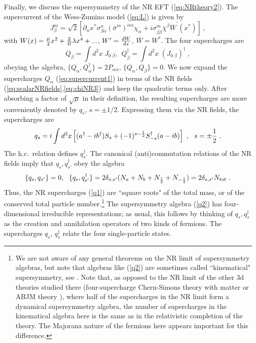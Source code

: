 \documentclass[11pt]{article}
\begin{document}
Finally, we discuss the supersymmetry of the NR EFT (\ref{eq:NRtheory2}). The supercurrent  of the Wess-Zumino model (\ref{eq:L}) is given by
  \cite{Shifman:1999mk}   \begin{equation}
    \label{eq:supercurrent1}
    J_\beta^m = \sqrt{2} \left[ \partial_n x^* \sigma^n_{\beta \dot\alpha} (\bar\sigma^m)^{\dot\alpha \alpha} \chi_\alpha + i \sigma^m_{\beta \dot\beta} \bar\chi^{\dot\beta} \overline{W}^\prime(x^*) \right]~,
    \end{equation}
 with $W(x) = {\mu \over 2} x^2 + {2 \over 4!} \lambda x^4 +...$, $W^\prime = {d W\over dx}$, $\overline{W}=W^*$. The four supercharges are 
\begin{equation}
\label{eq:supercharges1}
Q_\beta = \int d^2 x \; J_{0 \; \beta}, ~~ Q_{\dot\beta}^\dagger = \int d^2 x\; (J_{0 \; \beta})^\dagger~,
\end{equation}
obeying the algebra, $ \{ Q_\alpha, Q_{\dot\alpha}^\dagger  \} = 2 P_{\alpha \dot\alpha}$, $\{ Q_\alpha, Q_\beta \} = 0$. 
We now expand the supercharges $Q_\alpha$ (\ref{eq:supercurrent1}) in terms of the NR fields (\ref{eq:scalarNRfields},\ref{eq:chiNR3})  and keep the quadratic terms only. After absorbing a factor of $\sqrt{\mu}$ in their definition, the resulting supercharges  are more conveniently  denoted by $q_s$, $s = \pm 1/2$. Expressing them via the NR fields,  the supercharges  are
\begin{equation}\label{q1}
q_s = i \int d^2 x \left[ (a^\dagger - i b^\dagger) S_s + (-1)^{s-{1\over 2}} S_{-s}^\dagger (a  - i b)\right]~,~~ s = \pm{1 \over 2}~.
\end{equation}
The h.c.~relation defines $q_s^\dagger$.
The canonical (anti)commutation relations of the NR fields imply that  $q_s, q_{s'}^\dagger$ obey the algebra
\begin{align}
\label{q2}
\{ q_s, q_{s'}\} = 0, ~~ \{q_s, q_{s'}^\dagger\} = 2 \delta_{s,s'}(N_a + N_b + N_{1\over 2} + N_{-{1 \over 2}}) = 2 \delta_{s,s'} N_{tot}~.
\end{align}
Thus, the NR supercharges (\ref{q1}) are ``square roots" of the total mass, or of the conserved  total particle number.\footnote{We are not aware of any general theorems on the NR limit of supersymmetry algebras, but note that algebras  like (\ref{q2}) are sometimes called ``kinematical" supersymmetry,  see  \cite{Leblanc:1992wu, Nakayama:2009ed, Nakayama:2009cz}. Note that, as opposed to the NR limit of the other 3d theories studied there (four-supercharge Chern-Simons theory with matter \cite{Leblanc:1992wu} or ABJM theory \cite{Nakayama:2009ed,Nakayama:2009cz}), where half of the supercharges  in the NR limit form  a dynamical supersymmetry algebra, the number of supercharges in the kinematical algebra  here is the same as in the relativistic completion of the theory. The Majorana nature of the fermions here appears important for this difference.}
 The supersymmetry algebra (\ref{q2}) has four-dimensional irreducible representations; as usual, this follows by thinking of $q_s, q_s^\dagger$ as the creation and annihilation operators of two kinds of fermions. The supercharges $q_s$, $q_s^\dagger$ relate the four single-particle states. 
\end{document}
